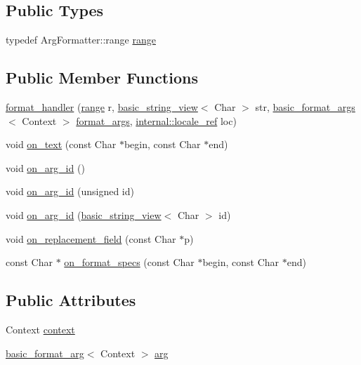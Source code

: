\subsection*{Public Types}
\begin{DoxyCompactItemize}
\item 
typedef Arg\+Formatter\+::range \hyperlink{structformat__handler_ac65f0cea520d6e2db8e8738bdbbfa246}{range}
\end{DoxyCompactItemize}
\subsection*{Public Member Functions}
\begin{DoxyCompactItemize}
\item 
\hyperlink{structformat__handler_a9bfd742776e1ff31e5ef9801d28fcf78}{format\+\_\+handler} (\hyperlink{structformat__handler_ac65f0cea520d6e2db8e8738bdbbfa246}{range} r, \hyperlink{classbasic__string__view}{basic\+\_\+string\+\_\+view}$<$ Char $>$ str, \hyperlink{classbasic__format__args}{basic\+\_\+format\+\_\+args}$<$ Context $>$ \hyperlink{structformat__args}{format\+\_\+args}, \hyperlink{classinternal_1_1locale__ref}{internal\+::locale\+\_\+ref} loc)
\item 
void \hyperlink{structformat__handler_a0658a1b87089088fae4267f567e9ee7d}{on\+\_\+text} (const Char $\ast$begin, const Char $\ast$end)
\item 
void \hyperlink{structformat__handler_a68a3fd78bb89496cb6b27f67b0ecb168}{on\+\_\+arg\+\_\+id} ()
\item 
void \hyperlink{structformat__handler_a7af75f0c8c9bfd281525c23c557610df}{on\+\_\+arg\+\_\+id} (unsigned id)
\item 
void \hyperlink{structformat__handler_a5030233b6e1cb1824e131712a3ec5156}{on\+\_\+arg\+\_\+id} (\hyperlink{classbasic__string__view}{basic\+\_\+string\+\_\+view}$<$ Char $>$ id)
\item 
void \hyperlink{structformat__handler_abe898802a15ef6686480569ab638b38a}{on\+\_\+replacement\+\_\+field} (const Char $\ast$p)
\item 
const Char $\ast$ \hyperlink{structformat__handler_a4d16ddae0958acb12d0606038c393b24}{on\+\_\+format\+\_\+specs} (const Char $\ast$begin, const Char $\ast$end)
\end{DoxyCompactItemize}
\subsection*{Public Attributes}
\begin{DoxyCompactItemize}
\item 
Context \hyperlink{structformat__handler_ac4b040908991e61745acef69487df339}{context}
\item 
\hyperlink{classbasic__format__arg}{basic\+\_\+format\+\_\+arg}$<$ Context $>$ \hyperlink{structformat__handler_a36cf5020da11b151d4ba46b0354a6356}{arg}
\end{DoxyCompactItemize}


